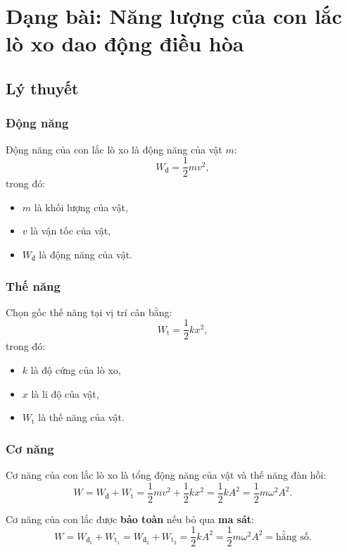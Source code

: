 
\chapter[Dạng bài: Năng lượng của con lắc lò xo dao động điều hòa]{Dạng bài: Năng lượng của con lắc lò xo dao động điều hòa}
\section{Lý thuyết}
\subsection{Động năng}
Động năng của con lắc lò xo là động năng của vật $m$:
\begin{equation*}
	W_{\text {đ}} = \dfrac {1}{2}mv^2,
\end{equation*}
trong đó:
\begin{itemize}
	\item  $m$ là khối lượng của vật,
	\item  $v$ là vận tốc của vật,
	\item $W_{\text {đ}}$ là động năng của vật.
\end{itemize}
\subsection{Thế năng}
Chọn gốc thế năng tại vị trí cân bằng:
\begin{equation*}
	W_{\text {t}} = \dfrac {1}{2}kx^2,
\end{equation*}
trong đó:
\begin{itemize}
	\item  $k$ là độ cứng của lò xo,
	\item  $x$ là li độ của vật,
	\item $W_\text{t}$ là thế năng của vật.
\end{itemize}
\subsection{Cơ năng}
Cơ năng của con lắc lò xo là tổng động năng của vật và thế năng đàn hồi:
\begin{equation*}
	W =W_{\text {đ}}+W_{\text {t}}= \dfrac {1}{2}mv^2 + \dfrac {1}{2}kx^2 = \dfrac {1}{2}kA^2 = \dfrac {1}{2} m \omega ^2 A^2.
\end{equation*}

Cơ năng của con lắc được \textbf{bảo toàn} nếu bỏ qua \textbf{ma sát}:
\begin{equation*}
	W =W_{\text {đ}_1}+W_{\text {t}_1}= W_{\text {đ}_2}+W_{\text {t}_2}=\dfrac {1}{2}kA^2 = \dfrac {1}{2} m \omega ^2 A^2= \text{hằng số}.
\end{equation*}


